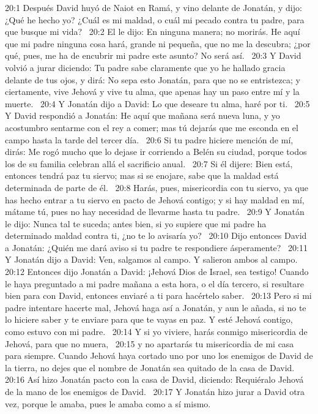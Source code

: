 20:1 Después David huyó de Naiot en Ramá, y vino delante de Jonatán, y dijo: ¿Qué he hecho yo? ¿Cuál es mi maldad, o cuál mi pecado contra tu padre, para que busque mi vida?  
20:2 El le dijo: En ninguna manera; no morirás. He aquí que mi padre ninguna cosa hará, grande ni pequeña, que no me la descubra; ¿por qué, pues, me ha de encubrir mi padre este asunto? No será así.  
20:3 Y David volvió a jurar diciendo: Tu padre sabe claramente que yo he hallado gracia delante de tus ojos, y dirá: No sepa esto Jonatán, para que no se entristezca; y ciertamente, vive Jehová y vive tu alma, que apenas hay un paso entre mí y la muerte.  
20:4 Y Jonatán dijo a David: Lo que deseare tu alma, haré por ti.  
20:5 Y David respondió a Jonatán: He aquí que mañana será nueva luna, y yo acostumbro sentarme con el rey a comer; mas tú dejarás que me esconda en el campo hasta la tarde del tercer día.  
20:6 Si tu padre hiciere mención de mí, dirás: Me rogó mucho que lo dejase ir corriendo a Belén su ciudad, porque todos los de su familia celebran allá el sacrificio anual.  
20:7 Si él dijere: Bien está, entonces tendrá paz tu siervo; mas si se enojare, sabe que la maldad está determinada de parte de él.  
20:8 Harás, pues, misericordia con tu siervo, ya que has hecho entrar a tu siervo en pacto de Jehová contigo; y si hay maldad en mí, mátame tú, pues no hay necesidad de llevarme hasta tu padre.  
20:9 Y Jonatán le dijo: Nunca tal te suceda; antes bien, si yo supiere que mi padre ha determinado maldad contra ti, ¿no te lo avisaría yo?  
20:10 Dijo entonces David a Jonatán: ¿Quién me dará aviso si tu padre te respondiere ásperamente?  
20:11 Y Jonatán dijo a David: Ven, salgamos al campo. Y salieron ambos al campo.  
20:12 Entonces dijo Jonatán a David: ¡Jehová Dios de Israel, sea testigo! Cuando le haya preguntado a mi padre mañana a esta hora, o el día tercero, si resultare bien para con David, entonces enviaré a ti para hacértelo saber.  
20:13 Pero si mi padre intentare hacerte mal, Jehová haga así a Jonatán, y aun le añada, si no te lo hiciere saber y te enviare para que te vayas en paz. Y esté Jehová contigo, como estuvo con mi padre.  
20:14 Y si yo viviere, harás conmigo misericordia de Jehová, para que no muera,  
20:15 y no apartarás tu misericordia de mi casa para siempre. Cuando Jehová haya cortado uno por uno los enemigos de David de la tierra, no dejes que el nombre de Jonatán sea quitado de la casa de David.  
20:16 Así hizo Jonatán pacto con la casa de David, diciendo: Requiéralo Jehová de la mano de los enemigos de David.  
20:17 Y Jonatán hizo jurar a David otra vez, porque le amaba, pues le amaba como a sí mismo.  
